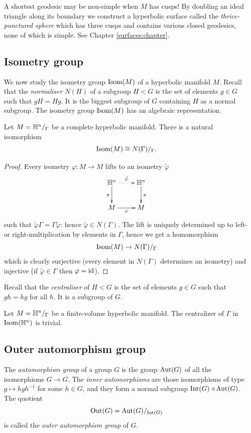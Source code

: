 \begin{rem}
A shortest geodesic may be non-simple when $M$ has cusps! By doubling an ideal triangle along its boundary we construct a hyperbolic surface called the \emph{thrice-punctured sphere} which has three cusps and contains various closed geodesics, none of which is simple. See Chapter \ref{surfaces:chapter}.
\end{rem}

\subsection{Isometry group}
We now study the isometry group ${\rm Isom}(M)$ of a hyperbolic manifold $M$.
Recall that the \emph{normaliser} $N(H)$ of a subgroup $H < G$ is the set of elements $g\in G$ such that $gH=Hg$. It is the biggest subgroup of $G$ containing $H$ as a normal subgroup.
The isometry group ${\rm Isom}(M)$ has an algebraic representation.

\begin{prop}
Let $M=\mathbb{H}^n/_\Gamma$ be a complete hyperbolic manifold. There is a natural isomorphism 
$${\rm Isom}(M) \cong N(\Gamma)/_\Gamma.$$
\end{prop}
\begin{proof}
Every isometry $\varphi\colon M \to M$ lifts to an isometry $\tilde \varphi$ 
$$
\xymatrix{ 
\matH^n\ar@{.>}[r]^{\tilde \varphi} \ar[d]_\pi & \matH^n \ar[d]^\pi \\
M\ar[r]_\varphi & M
}
$$
such that $\tilde\varphi \Gamma = \Gamma \tilde\varphi$: hence $\tilde\varphi \in N(\Gamma)$. The lift is uniquely determined up to left- or right-multiplication by elements in $\Gamma$, hence we get a homomorphism
$${\rm Isom}(M) \to N(\Gamma)/_\Gamma$$
which is clearly surjective (every element in $N(\Gamma)$ determines an isometry) and injective (if $\tilde\varphi\in\Gamma$ then $\varphi={\rm id}$).
\end{proof}

Recall that the \emph{centraliser} of $H< G$ is the set of elements $g \in G$ such that $gh=hg$ for all $h$. It is a subgroup of $G$.

\begin{ex} \label{centralizer:ex}
Let $M=\mathbb{H}^n/_\Gamma$ be a finite-volume hyperbolic manifold. The centralizer of $\Gamma$ in ${\rm Isom}(\mathbb{H}^n)$ is trivial.
\end{ex}

\subsection{Outer automorphism group}
The \emph{automorphism group} of a group $G$ is the group ${\rm Aut}(G)$ of all the isomorphisms $G\to G$. The \emph{inner automorphisms} are those isomorphisms of type $g\mapsto hgh^{-1}$ for some $h\in G$, and they form a normal subgroup ${\rm Int}(G)\triangleleft {\rm Aut}(G)$. The quotient
$${\rm Out}(G) = {\rm Aut}(G)/_{{\rm Int}(G)}$$
is called the \emph{outer automorphism group} of $G$.

